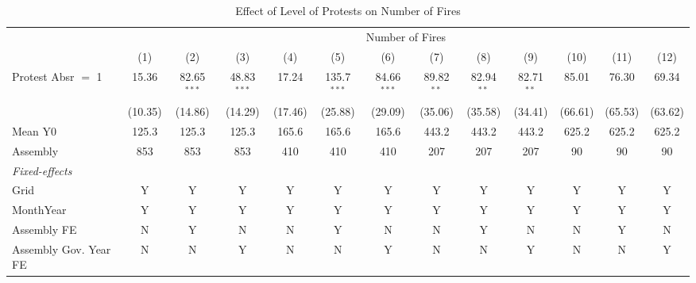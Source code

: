 
\begin{table}[htbp]
   \caption{\label{tab:protest_treat_main} Effect of Level of Protests on Number of Fires}
   \centering
   \begin{tabular}{lcccccccccccc}
      \tabularnewline \midrule \midrule
       & \multicolumn{12}{c}{Number of Fires}\\
                                & (1)        & (2)           & (3)           & (4)       & (5)           & (6)           & (7)          & (8)          & (9)          & (10)      & (11)      & (12)\\  
      \midrule 
      Protest Absr $=$ 1        & 15.36      & 82.65$^{***}$ & 48.83$^{***}$ & 17.24     & 135.7$^{***}$ & 84.66$^{***}$ & 89.82$^{**}$ & 82.94$^{**}$ & 82.71$^{**}$ & 85.01     & 76.30     & 69.34\\   
                                & (10.35)    & (14.86)       & (14.29)       & (17.46)   & (25.88)       & (29.09)       & (35.06)      & (35.58)      & (34.41)      & (66.61)   & (65.53)   & (63.62)\\   
      \hline Mean Y0            & 125.3      & 125.3         & 125.3         & 165.6     & 165.6         & 165.6         & 443.2        & 443.2        & 443.2        & 625.2     & 625.2     & 625.2\\  
      Assembly                  & 853        & 853           & 853           & 410       & 410           & 410           & 207          & 207          & 207          & 90        & 90        & 90\\  
      \midrule
      \emph{Fixed-effects}\\
      Grid                      & Y          & Y             & Y             & Y         & Y             & Y             & Y            & Y            & Y            & Y         & Y         & Y\\  
      MonthYear                 & Y          & Y             & Y             & Y         & Y             & Y             & Y            & Y            & Y            & Y         & Y         & Y\\  
      Assembly FE               & N          & Y             & N             & N         & Y             & N             & N            & Y            & N            & N         & Y         & N\\  
      Assembly Gov. Year FE     & N          & N             & Y             & N         & N             & Y             & N            & N            & Y            & N         & N         & Y\\  

\end{tabular}
\end{table}
